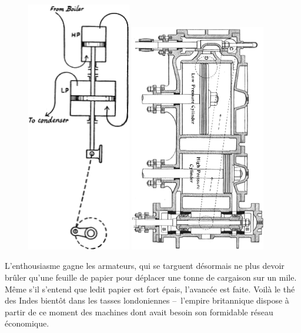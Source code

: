 	\begin{figure}
		\begin{center}
			\includegraphics[height=11cm, max height=0.55\textheight]{images/ripper_compound_1.png}
			\includegraphics[height=10cm, max height=0.55\textheight]{images/ripper_compound_2.png}
		\end{center}
	\end{figure}

	L’enthousiasme gagne les armateurs, qui se targuent désormais ne plus devoir brûler qu’une feuille de papier pour déplacer une tonne de cargaison sur un mile. Même s’il s’entend que ledit papier est fort épais, l’avancée est faite. Voilà le thé des Indes bientôt dans les tasses londoniennes --\ l’empire britannique dispose à partir de ce moment des machines dont avait besoin son formidable réseau économique.
\atendofhistorysection
